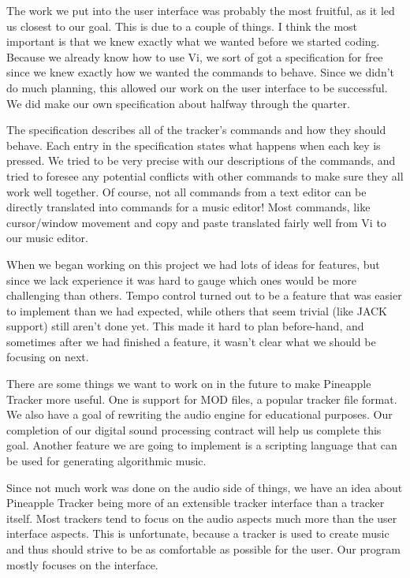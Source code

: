 \documentclass[12pt,letterpaper]{article}
\begin{document}

\par
The work we put into the user interface was probably the most fruitful, as it led us closest to our goal.
This is due to a couple of things.
I think the most important is that we knew exactly what we wanted before we started coding.
Because we already know how to use Vi, we sort of got a specification for free since we knew exactly how we wanted the commands to behave.
Since we didn't do much planning, this allowed our work on the user interface to be successful.
We did make our own specification about halfway through the quarter.

\par
The specification describes all of the tracker's commands and how they should behave.
Each entry in the specification states what happens when each key is pressed.
We tried to be very precise with our descriptions of the commands, and tried to foresee any potential conflicts with other commands to make sure they all work well together.
Of course, not all commands from a text editor can be directly translated into commands for a music editor!
Most commands, like cursor/window movement and copy and paste translated fairly well from Vi to our music editor.

\par
When we began working on this project we had lots of ideas for features, but since we lack experience it was hard to gauge which ones would be more challenging than others.
Tempo control turned out to be a feature that was easier to implement than we had expected, while others that seem trivial (like JACK support) still aren't done yet.
This made it hard to plan before-hand, and sometimes after we had finished a feature, it wasn't clear what we should be focusing on next.

\par
There are some things we want to work on in the future to make Pineapple Tracker more useful.
One is support for MOD files, a popular tracker file format.
We also have a goal of rewriting the audio engine for educational purposes.
Our completion of our digital sound processing contract will help us complete this goal.
Another feature we are going to implement is a scripting language that can be used for generating algorithmic music.

\par
Since not much work was done on the audio side of things, we have an idea about Pineapple Tracker being more of an extensible tracker interface than a tracker itself. 
Most trackers tend to focus on the audio aspects much more than the user interface aspects.
This is unfortunate, because a tracker is used to create music and thus should strive to be as comfortable as possible for the user.
Our program mostly focuses on the interface.
\end{document}
